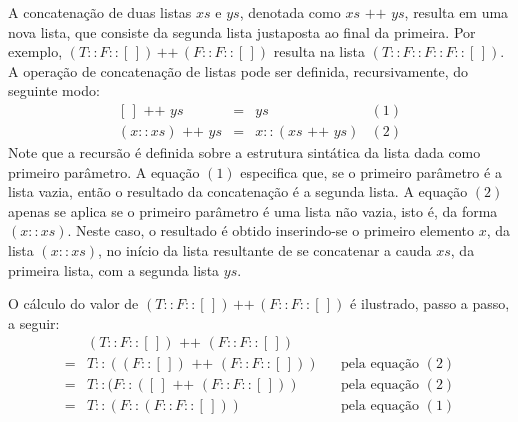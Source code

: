 \begin{Definition}\label{def:concat:lists}
A concatenação de duas listas $xs$ e $ys$, denotada como $xs\text{ ++ }ys$, resulta em uma nova lista, 
que consiste da segunda lista justaposta ao final da primeira. Por exemplo,  $(T :: F :: [\,])\,\text{++}\,(F :: F :: [\,])$ resulta na lista $(T :: F :: F :: F :: [\,])$. A operação de concatenação de listas pode ser definida, recursivamente, do seguinte modo:
 \[
  \begin{array}{lclr}
    [\,] \text { ++ } ys & = & ys & (1)\\
    (x :: xs) \text{ ++ }  ys & = & x :: (xs\text{ ++ } ys) & (2)
  \end{array}
  \]
Note que a recursão é definida sobre a estrutura sint\'atica da lista dada como primeiro par\^ametro. A equa\c{c}\~ao $(1)$ especifica que, se o primeiro parâmetro é a lista vazia, ent\~ao o resultado da concatena\c{c}\~ao \'e a segunda lista. A equa\c{c}\~ao $(2)$ apenas se aplica se o primeiro parâmetro é uma lista não vazia, isto é, da forma $(x :: xs)$. Neste caso, o resultado \'e obtido inserindo-se o primeiro elemento $x$, da lista $(x :: xs)$, no in\'icio da lista resultante de se concatenar a cauda $xs$, da primeira lista, com a segunda lista $ys$.
\end{Definition}

\begin{Example}
O cálculo do valor de $(T :: F :: [\,])\,\text{++}\,(F :: F :: [\,])$ é ilustrado, passo a passo, a seguir:
\[
\begin{array}{llcl}
& (T :: F :: [\,]) \text{ ++ } (F :: F ::[\,])       & & \\
= & T :: ((F :: [\,]) \text{ ++ } (F :: F ::[\,])) &  & \text{pela equa\c{c}\~ao }(2)\\
= & T :: (F :: ([\,] \text{ ++ } (F :: F ::[\,]))  &  & \text{pela equa\c{c}\~ao }(2)\\
= & T :: (F :: (F :: F ::[\,]))                          &  & \text{pela equa\c{c}\~ao }(1)\\
\end{array}
\]
\end{Example}


